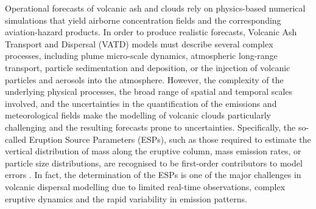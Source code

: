 \introduction 
%
%
Operational forecasts of volcanic ash and  clouds rely on physics-based numerical simulations that yield airborne concentration fields and the corresponding aviation-hazard products. In order to produce realistic forecasts, Volcanic Ash Transport and Dispersal (VATD) models must describe several complex processes, including plume micro-scale dynamics, atmospheric long-range transport, particle sedimentation and deposition, or the injection of volcanic particles and aerosols into the atmosphere. However, the complexity of the underlying physical processes, the broad range of spatial and temporal scales involved, and the uncertainties in the quantification of the emissions and meteorological fields make the modelling of volcanic clouds particularly challenging and the resulting forecasts prone to uncertainties.
%
%
Specifically, the so-called Eruption Source Parameters (ESPs), such as those required to estimate the vertical distribution of mass along the eruptive column, mass emission rates, or particle size distributions, are recognised to be first-order contributors to model errors \citep{costa2016,poulidis2021}. In fact, the determination of the ESPs is one of the major challenges in volcanic dispersal modelling due to limited real-time observations, complex eruptive dynamics and the rapid variability in emission patterns.


